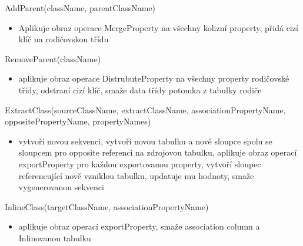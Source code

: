 \documentclass[11pt,twoside,a4paper]{book}
\begin{document}
\begin{list}{Operace :}{}
  \item AddParent(className, parentClassName)
  \begin{itemize}
    \item Aplikuje obraz operace MergeProperty na všechny kolizní property,
	přidá cizí klíč na rodičovskou třídu
  \end{itemize}

  \item RemoveParent(className)
  \begin{itemize}
    \item aplikuje obraz operace DistrubuteProperty na všechny property
	rodičovské třídy, odstraní cizí klíč, smaže data třídy potomka z tabulky
	rodiče
  \end{itemize}

  \item ExtractClass(sourceClassName, extractClassName, associationPropertyName,
  oppositePropertyName, propertyNames)
  \begin{itemize}
    \item vytvoří novou sekvenci, vytvoří novou
    tabulku a nové sloupce spolu se sloupcem pro opposite referenci na
    zdrojovou tabulku, aplikuje obraz operací exportProperty pro každou
    exportovanou property, vytvoří sloupec referencující nově vzniklou tabulku, updatuje
    mu hodnoty, smaže vygenerovanou sekvenci
  \end{itemize}
  
  \item InlineClass(targetClassName, associationPropertyName)
  \begin{itemize}
    \item aplikuje obraz operací exportProperty, smaže association column a
	Inlinovanou tabulku
  \end{itemize}



\end{list}
\end{document}

